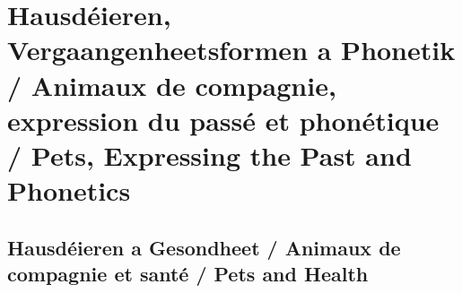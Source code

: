 \vspace{1.5em}

\section[Hausdéieren, Vergaangenheetsformen a Phonetik / Pets, Past Tenses and Phonetics]{Hausdéieren, Vergaangenheetsformen a Phonetik \\/ Animaux de compagnie, expression du passé et phonétique \\/ Pets, Expressing the Past and Phonetics}

\subsection{Hausdéieren a Gesondheet / Animaux de compagnie et santé / Pets and Health}

